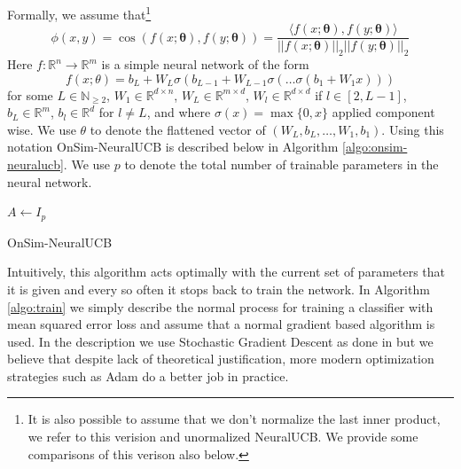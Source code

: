 \documentclass{article}
\begin{document}
Formally, we assume that\footnote{It is also possible to assume that we don't normalize the last inner product, we refer to this verision and unormalized NeuralUCB. We provide some comparisons of this verison also below.}
\[ \phi(x,y) = \cos\left(f(x;\mathbf{\theta}), f(y;\mathbf{\theta})\right) = \frac{\langle f(x;\mathbf{\theta}), f(y;\mathbf{\theta}) \rangle}{||f(x;\mathbf{\theta})||_2 ||f(y;\mathbf{\theta})||_2}\]
Here $f: \mathbb{R}^n \to \mathbb{R}^m$ is a simple neural network of the form
\[ f(x; \theta) = b_L + W_{L} \sigma\left(b_{L-1} +  W_{L-1} \sigma\left( \dots \sigma\left(b_1 + W_1 x\right)\right) \right)\]
for some $L \in \mathbb{N}_{\geq 2}$, $W_1 \in \mathbb{R}^{d \times n}$, $W_{L} \in \mathbb{R}^{m \times d}$, $W_{l} \in \mathbb{R}^{d\times d}$ if $l \in [2, L-1]$, $b_L \in \mathbb{R}^m$, $b_l \in \mathbb{R}^d$ for $l \neq L$, and where $\sigma(x) = \max\{0, x\}$ applied component wise. We use $\theta$ to denote the flattened vector of $(W_L, b_L, \dots, W_1, b_1)$.
Using this notation OnSim-NeuralUCB is described below in Algorithm \ref{algo:onsim-neuralucb}. We use $p$ to denote the total number of trainable parameters in the neural network.

\begin{algorithm}
  \label{algo:onsim-neuralucb}
    $A \gets I_{p}$\;
    \caption{OnSim-NeuralUCB}
  \end{algorithm}

Intuitively, this algorithm acts optimally with the current set of parameters that it is given and every so often it stops back to train the network. In Algorithm \ref{algo:train} we simply describe the normal process for training a classifier with mean squared error loss and assume that a normal gradient based algorithm is used.
In the description we use Stochastic Gradient Descent as done in \cite{neuralucb} but we believe that despite lack of theoretical justification, more modern optimization strategies such as Adam \cite{adam} do a better job in practice.
\end{document}
